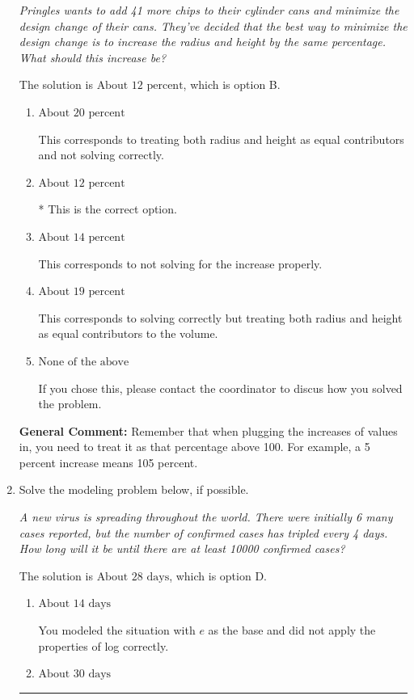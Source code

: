 \documentclass{extbook}[14pt]
\newcommand{\litem}[1]{\item #1

\rule{\textwidth}{0.4pt}}
\begin{document}
\begin{enumerate}
{\begin{center}
    \textit{ Pringles wants to add 41  more chips to their cylinder cans and minimize the design change of their cans. They've decided that the best way to minimize the design change is to increase the radius and height by the same percentage. What should this increase be? }
\end{center}
The solution is \( \text{About } 12 \text{ percent} \), which is option B.\begin{enumerate}[label=\Alph*.]
\item \( \text{About } 20 \text{ percent} \)

This corresponds to treating both radius and height as equal contributors and not solving correctly.
\item \( \text{About } 12 \text{ percent} \)

* This is the correct option.
\item \( \text{About } 14 \text{ percent} \)

This corresponds to not solving for the increase properly.
\item \( \text{About } 19 \text{ percent} \)

This corresponds to solving correctly but treating both radius and height as equal contributors to the volume.
\item \( \text{None of the above} \)

If you chose this, please contact the coordinator to discus how you solved the problem.
\end{enumerate}

\textbf{General Comment:} Remember that when plugging the increases of values in, you need to treat it as that percentage above 100. For example, a 5 percent increase means 105 percent.
}
\litem{
Solve the modeling problem below, if possible.

\begin{center}
    \textit{ A new virus is spreading throughout the world. There were initially 6 many cases reported, but the number of confirmed cases has tripled every 4 days. How long will it be until there are at least 10000 confirmed cases? }
\end{center}
The solution is \( \text{About } 28 \text{ days} \), which is option D.\begin{enumerate}[label=\Alph*.]
\item \( \text{About } 14 \text{ days} \)

You modeled the situation with $e$ as the base and did not apply the properties of log correctly.
\item \( \text{About } 30 \text{ days} \)


\end{enumerate}}
\end{enumerate}
\end{document}
